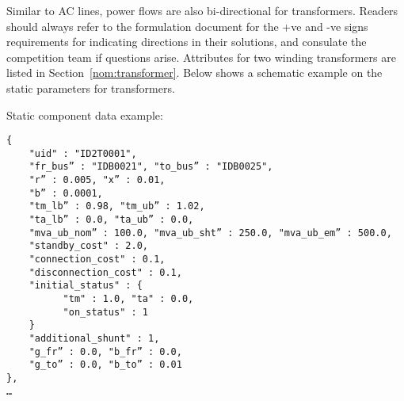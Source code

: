 Similar to AC lines, power flows are also bi-directional for transformers. 
Readers should always refer to the formulation document for the +ve and -ve signs
requirements for indicating directions in their solutions,
and consulate the competition team if questions arise.
Attributes for two winding transformers are listed in Section~\ref{nom:transformer}.
Below shows a schematic example on the static parameters for transformers.

Static component data example:
\begin{verbatim}
{
    "uid" : "ID2T0001",
    "fr_bus” : "IDB0021", "to_bus” : "IDB0025",
    "r” : 0.005, "x” : 0.01, 
    "b” : 0.0001,
    "tm_lb” : 0.98, "tm_ub” : 1.02, 
    "ta_lb” : 0.0, "ta_ub” : 0.0, 
    "mva_ub_nom” : 100.0, "mva_ub_sht” : 250.0, "mva_ub_em” : 500.0,
    "standby_cost" : 2.0,
    "connection_cost" : 0.1,
    "disconnection_cost" : 0.1,
    "initial_status" : {
          "tm" : 1.0, "ta" : 0.0,
          "on_status" : 1
    }
    "additional_shunt" : 1,
    "g_fr” : 0.0, "b_fr” : 0.0,
    "g_to” : 0.0, "b_to” : 0.01    
},
…     
\end{verbatim}


